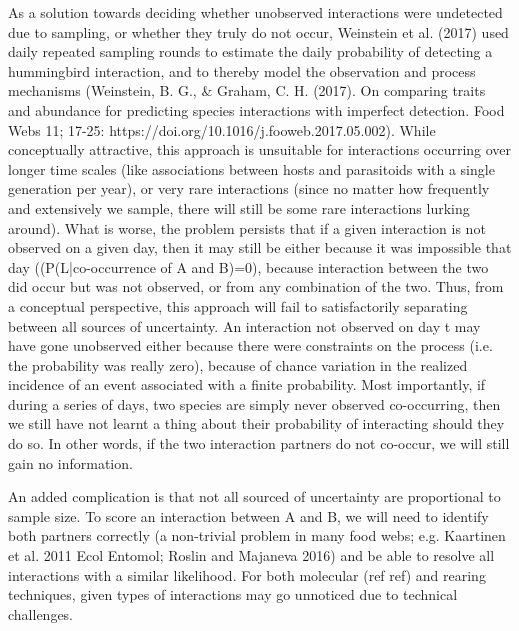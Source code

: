 \documentclass[12pt]{article}
\begin{document}
As a solution towards deciding whether unobserved interactions were undetected due to sampling, or whether they truly do not occur, Weinstein et al. (2017) used daily repeated sampling rounds to estimate the daily probability of detecting a hummingbird interaction, and to thereby model the observation and process mechanisms (Weinstein, B. G., & Graham, C. H. (2017). On comparing traits and abundance for predicting species interactions with imperfect detection. Food Webs 11; 17-25: https://doi.org/10.1016/j.fooweb.2017.05.002). While conceptually attractive, this approach is unsuitable for interactions occurring over longer time scales (like associations between hosts and parasitoids with a single generation per year), or very rare interactions (since no matter how frequently and extensively we sample, there will still be some rare interactions lurking around). What is worse, the problem persists that if a given interaction is not observed on a given day, then it may still be either because it was impossible that day ((P(L|co-occurrence of A and B)=0), because interaction between the two did occur but was not observed, or from any combination of the two. Thus, from a conceptual perspective, this approach will fail to satisfactorily separating between all sources of uncertainty. An interaction not observed on day t may have gone unobserved either because there were constraints on the process (i.e. the probability was really zero), because of chance variation in the realized incidence of an event associated with a finite probability. Most importantly, if during a series of days, two species are simply never observed co-occurring, then we still have not learnt a thing about their probability of interacting should they do so. In other words, if the two interaction partners do not co-occur, we will still gain no information.

An added complication is that not all sourced of uncertainty are proportional to sample size. To score an interaction between A and B, we will need to identify both partners correctly (a non-trivial problem in many food webs; e.g. Kaartinen et al. 2011 Ecol Entomol; Roslin and Majaneva 2016) and be able to resolve all interactions with a similar likelihood. For both molecular (ref ref) and rearing techniques, given types of interactions may go unnoticed due to technical challenges.
\end{document}
